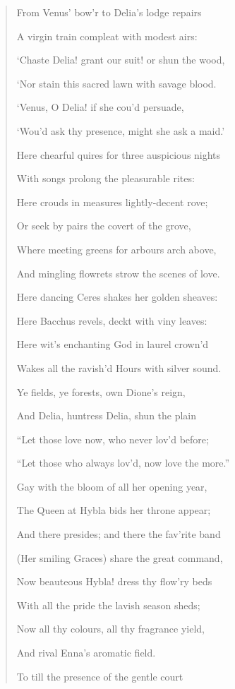 \documentclass[a4paper, 11pt, oneside, polutonikogreek, english]{article}
\begin{document}
\begin{quotation}
\hspace*{15mm}From Venus' bow'r to Delia's lodge repairs

A virgin train compleat with modest airs:

`Chaste Delia! grant our suit! or shun the wood,

`Nor stain this sacred lawn with savage blood.

`Venus, O Delia! if she cou'd persuade, 

`Wou'd ask thy presence, might she ask a maid.'

Here chearful quires for three auspicious nights

With songs prolong the pleasurable rites:

Here crouds in measures lightly-decent rove;

Or seek by pairs the covert of the grove,

Where meeting greens for arbours arch above,

And mingling flowrets strow the scenes of love.

Here dancing Ceres shakes her golden sheaves:

Here Bacchus revels, deckt with viny leaves:

Here wit's enchanting God in laurel crown'd

Wakes all the ravish'd Hours with silver sound.

Ye fields, ye forests, own Dione's reign,

And Delia, huntress Delia, shun the plain

\hspace*{15mm}``Let those love now, who never lov'd before;

``Let those who always lov'd, now love the more.''

\hspace*{15mm}Gay with the bloom of all her opening year,

The Queen at Hybla bids her throne appear;

And there presides; and there the fav'rite band

(Her smiling Graces) share the great command,

Now beauteous Hybla! dress thy flow'ry beds

With all the pride the lavish season sheds;

Now all thy colours, all thy fragrance yield,

And rival Enna's aromatic field.

To till the presence of the gentle court


\end{quotation}
\end{document}
